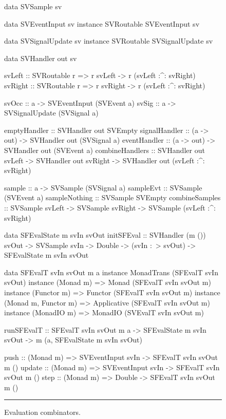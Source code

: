 \begin{figure}
\begin{code}
data SVSample sv

data SVEventInput sv
instance SVRoutable SVEventInput sv

data SVSignalUpdate sv
instance SVRoutable SVSignalUpdate sv

data SVHandler out sv

svLeft          :: SVRoutable r =>
                   r svLeft -> r (svLeft :^: svRight)
svRight         :: SVRoutable r =>
                   r svRight -> r (svLeft :^: svRight)

svOcc           :: a -> SVEventInput (SVEvent a)
svSig           :: a -> SVSignalUpdate (SVSignal a)
 
emptyHandler    :: SVHandler out SVEmpty
signalHandler   :: (a -> out) -> SVHandler out (SVSignal a)
eventHandler    :: (a -> out) -> SVHandler out (SVEvent a)
combineHandlers ::    SVHandler out svLeft
                   -> SVHandler out svRight
                   -> SVHandler out (svLeft :^: svRight)

sample          :: a -> SVSample (SVSignal a)
sampleEvt       :: SVSample (SVEvent a)
sampleNothing   :: SVSample SVEmpty
combineSamples  ::    SVSample svLeft
                   -> SVSample svRight
                   -> SVSample (svLeft :^: svRight)

data SFEvalState m svIn svOut
initSFEval ::    SVHandler (m ()) svOut
              -> SVSample svIn
              -> Double
              -> (svIn :~> svOut)
              -> SFEvalState m svIn svOut

data SFEvalT svIn svOut m a
instance MonadTrans (SFEvalT svIn svOut)
instance (Monad m) => Monad (SFEvalT svIn svOut m)
instance (Functor m) => Functor (SFEvalT svIn svOut m)
instance (Monad m, Functor m) => Applicative (SFEvalT svIn svOut m)
instance (MonadIO m) => MonadIO (SVEvalT svIn svOut m)

runSFEvalT ::    SFEvalT svIn svOut m a
              -> SFEvalState m svIn svOut
              -> m (a, SFEvalState m svIn svOut)
              
push :: (Monad m) => SVEventInput svIn -> SFEvalT svIn svOut m ()
update :: (Monad m) => SVEventInput svIn -> SFEvalT svIn svOut m ()
step :: (Monad m) => Double -> SFEvalT svIn svOut m ()
\end{code}
\hrule
\caption{Evaluation combinators.}
\label{figure:evaluation_combinators}
\end{figure}

